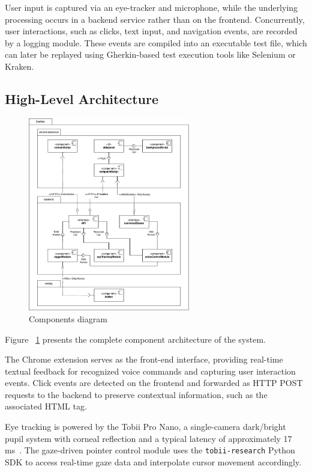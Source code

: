 User input is captured via an eye-tracker and microphone, while the underlying processing occurs in a backend service rather than on the frontend. Concurrently, user interactions, such as clicks, text input, and navigation events, are recorded by a logging module. These events are compiled into an executable test file, which can later be replayed using Gherkin-based test execution tools like Selenium\cite{garcia2024selenium} or Kraken\cite{ravelo2023kraken}.


\subsection{High-Level Architecture}

\begin{figure}
    \centering
    \includegraphics[width=200pt]{imgs/components-diagram.jpg}
    \caption{Components diagram}
    \vspace{-13pt}
    \label{fig:components-diagram}
\end{figure}

Figure ~\ref{fig:components-diagram} presents the complete component architecture of the system.

The Chrome extension serves as the front-end interface, providing real-time textual feedback for recognized voice commands and capturing user interaction events. Click events are detected on the frontend and forwarded as HTTP POST requests to the backend to preserve contextual information, such as the associated HTML tag. 

Eye tracking is powered by the Tobii Pro Nano, a single-camera dark/bright pupil system with corneal reflection and a typical latency of approximately 17 ms~\cite{tobiiabndpronano}. The gaze-driven pointer control module uses the \verb|tobii-research| Python SDK to access real-time gaze data and interpolate cursor movement accordingly.

